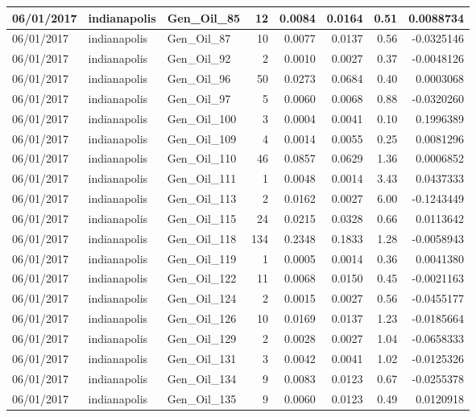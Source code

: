 \documentclass[
  letterpaper,
  DIV=11,
  numbers=noendperiod]{scrartcl}
\begin{document}
\begin{tabular}{l|l|l|r|r|r|r|r}
\hline
06/01/2017 & indianapolis & Gen\_Oil\_85 & 12 & 0.0084 & 0.0164 & 0.51 & 0.0088734\\
\hline
06/01/2017 & indianapolis & Gen\_Oil\_87 & 10 & 0.0077 & 0.0137 & 0.56 & -0.0325146\\
\hline
06/01/2017 & indianapolis & Gen\_Oil\_92 & 2 & 0.0010 & 0.0027 & 0.37 & -0.0048126\\
\hline
06/01/2017 & indianapolis & Gen\_Oil\_96 & 50 & 0.0273 & 0.0684 & 0.40 & 0.0003068\\
\hline
06/01/2017 & indianapolis & Gen\_Oil\_97 & 5 & 0.0060 & 0.0068 & 0.88 & -0.0320260\\
\hline
06/01/2017 & indianapolis & Gen\_Oil\_100 & 3 & 0.0004 & 0.0041 & 0.10 & 0.1996389\\
\hline
06/01/2017 & indianapolis & Gen\_Oil\_109 & 4 & 0.0014 & 0.0055 & 0.25 & 0.0081296\\
\hline
06/01/2017 & indianapolis & Gen\_Oil\_110 & 46 & 0.0857 & 0.0629 & 1.36 & 0.0006852\\
\hline
06/01/2017 & indianapolis & Gen\_Oil\_111 & 1 & 0.0048 & 0.0014 & 3.43 & 0.0437333\\
\hline
06/01/2017 & indianapolis & Gen\_Oil\_113 & 2 & 0.0162 & 0.0027 & 6.00 & -0.1243449\\
\hline
06/01/2017 & indianapolis & Gen\_Oil\_115 & 24 & 0.0215 & 0.0328 & 0.66 & 0.0113642\\
\hline
06/01/2017 & indianapolis & Gen\_Oil\_118 & 134 & 0.2348 & 0.1833 & 1.28 & -0.0058943\\
\hline
06/01/2017 & indianapolis & Gen\_Oil\_119 & 1 & 0.0005 & 0.0014 & 0.36 & 0.0041380\\
\hline
06/01/2017 & indianapolis & Gen\_Oil\_122 & 11 & 0.0068 & 0.0150 & 0.45 & -0.0021163\\
\hline
06/01/2017 & indianapolis & Gen\_Oil\_124 & 2 & 0.0015 & 0.0027 & 0.56 & -0.0455177\\
\hline
06/01/2017 & indianapolis & Gen\_Oil\_126 & 10 & 0.0169 & 0.0137 & 1.23 & -0.0185664\\
\hline
06/01/2017 & indianapolis & Gen\_Oil\_129 & 2 & 0.0028 & 0.0027 & 1.04 & -0.0658333\\
\hline
06/01/2017 & indianapolis & Gen\_Oil\_131 & 3 & 0.0042 & 0.0041 & 1.02 & -0.0125326\\
\hline
06/01/2017 & indianapolis & Gen\_Oil\_134 & 9 & 0.0083 & 0.0123 & 0.67 & -0.0255378\\
\hline
06/01/2017 & indianapolis & Gen\_Oil\_135 & 9 & 0.0060 & 0.0123 & 0.49 & 0.0120918\\

\end{tabular}
\end{document}
